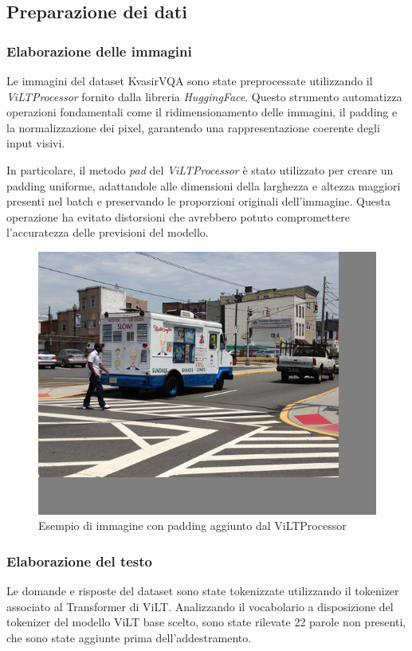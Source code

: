 \documentclass[../main.tex]{subfiles}
\begin{document}
\subsection{Preparazione dei dati}

\subsubsection{Elaborazione delle immagini}

Le immagini del dataset KvasirVQA sono state preprocessate utilizzando il \textit{ViLTProcessor} fornito dalla libreria \textit{HuggingFace}. Questo strumento automatizza operazioni fondamentali come il ridimensionamento delle immagini, il padding e la normalizzazione dei pixel, garantendo una rappresentazione coerente degli input visivi.

In particolare, il metodo \textit{pad} del \textit{ViLTProcessor} è stato utilizzato per creare un padding uniforme, adattandole alle dimensioni della larghezza e altezza maggiori presenti nel batch e preservando le proporzioni originali dell'immagine. 
Questa operazione ha evitato distorsioni che avrebbero potuto compromettere l'accuratezza delle previsioni del modello.

\begin{figure}[H]
    \centering
    \includegraphics[width=0.5\linewidth]{static/vilt_padding.png}
    \caption{Esempio di immagine con padding aggiunto dal ViLTProcessor}
    \label{fig:enter-label}
\end{figure}

\subsubsection{Elaborazione del testo}

Le domande e risposte del dataset sono state tokenizzate utilizzando il tokenizer associato al Transformer di ViLT. 
Analizzando il vocabolario a disposizione del tokenizer del modello ViLT base scelto, sono state rilevate 22 parole non presenti, che sono state aggiunte prima dell'addestramento.
\end{document}

